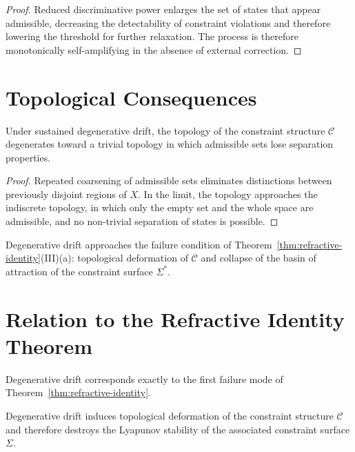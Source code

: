 \documentclass[11pt,openany]{book}
\begin{document}
\begin{proof}
Reduced discriminative power enlarges the set of states
that appear admissible, decreasing the detectability of
constraint violations and therefore lowering the threshold
for further relaxation.  The process is therefore
monotonically self-amplifying in the absence of external
correction.
\end{proof}

\section{Topological Consequences}
\label{sec:topological}

\begin{proposition}
\label{prop:topology-collapse}
Under sustained degenerative drift, the topology of the
constraint structure $\mathcal{C}$ degenerates toward a
trivial topology in which admissible sets lose separation
properties.
\end{proposition}

\begin{proof}
Repeated coarsening of admissible sets eliminates
distinctions between previously disjoint regions of $X$.
In the limit, the topology approaches the indiscrete
topology, in which only the empty set and the whole space
are admissible, and no non-trivial separation of states is
possible.
\end{proof}

\begin{corollary}
\label{cor:threshold}
Degenerative drift approaches the failure condition of
Theorem~\ref{thm:refractive-identity}(III)(a): topological
deformation of $\mathcal{C}$ and collapse of the basin of
attraction of the constraint surface $\Sigma^*$.
\end{corollary}

\section{Relation to the Refractive Identity Theorem}
\label{sec:relation-theorem}

Degenerative drift corresponds exactly to the first failure
mode of Theorem~\ref{thm:refractive-identity}.

\begin{proposition}
\label{prop:equivalence}
Degenerative drift induces topological deformation of the
constraint structure $\mathcal{C}$ and therefore destroys
the Lyapunov stability of the associated constraint surface
$\Sigma$.
\end{proposition}
\end{document}
